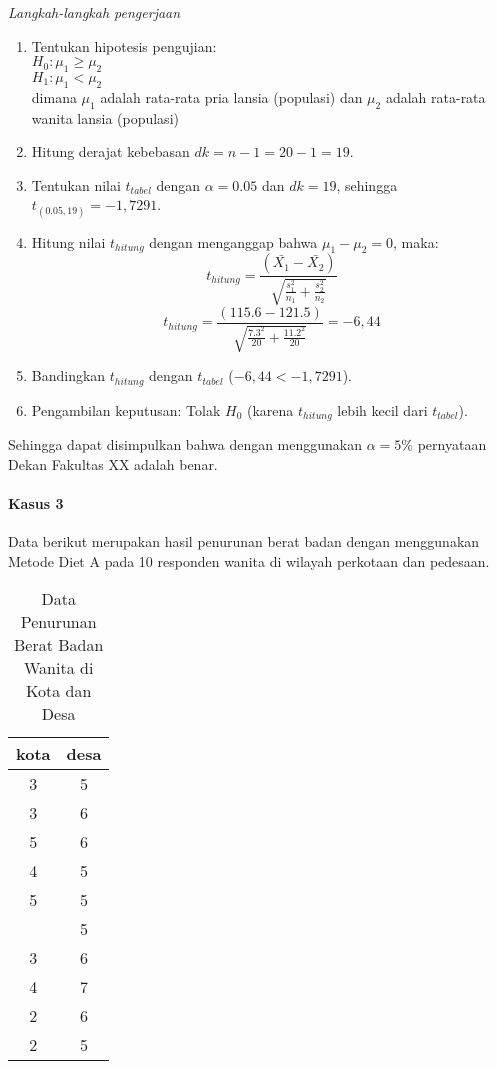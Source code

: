 \documentclass[
]{book}
\providecommand{\tightlist}{%
  \setlength{\itemsep}{0pt}\setlength{\parskip}{0pt}}
\begin{document}
\emph{Langkah-langkah pengerjaan}

\begin{enumerate}
\def\labelenumi{\arabic{enumi}.}
\tightlist
\item
  Tentukan hipotesis pengujian:\\
  \(H_0 : \mu_1 \geq \mu_2\)\\
  \(H_1 : \mu_1 < \mu_2\)\\
  dimana \(\mu_1\) adalah rata-rata pria lansia (populasi) dan \(\mu_2\) adalah rata-rata wanita lansia (populasi)
\item
  Hitung derajat kebebasan \(dk = n - 1 = 20 - 1 = 19\).
\item
  Tentukan nilai \(t_{tabel}\) dengan \(\alpha=0.05\) dan \(dk = 19\), sehingga \(t_{(0.05,19)} = -1,7291\).
\item
  Hitung nilai \(t_{hitung}\) dengan menganggap bahwa \(\mu_1-\mu_2 = 0\), maka:\\
  \[
  t_{hitung} = \frac{(\bar{X_1}-\bar{X_2})}{\sqrt{\frac{s_1^2}{n_1}+\frac{s_2^2}{n_2}}}
  \]
  \[
  t_{hitung} = \frac{(115.6-121.5)}{\sqrt{\frac{7.3^2}{20}+\frac{11.2^2}{20}}} = -6,44
  \]
\item
  Bandingkan \(t_{hitung}\) dengan \(t_{tabel}\) (\(-6,44<-1,7291\)).
\item
  Pengambilan keputusan: Tolak \(H_0\) (karena \(t_{hitung}\) lebih kecil dari \(t_{tabel}\)).
\end{enumerate}

Sehingga dapat disimpulkan bahwa dengan menggunakan \(\alpha = 5\%\) pernyataan Dekan Fakultas XX adalah benar.

\hypertarget{kasus-3}{%
\paragraph{Kasus 3}\label{kasus-3}}

Data berikut merupakan hasil penurunan berat badan dengan menggunakan Metode Diet A pada 10 responden wanita di wilayah perkotaan dan pedesaan.

\begin{table}

\caption{\label{tab:unnamed-chunk-9}Data Penurunan Berat Badan Wanita di Kota dan Desa}
\centering
\begin{tabular}[t]{cc}
\toprule
kota & desa\\
\midrule
3 & 5\\
3 & 6\\
5 & 6\\
4 & 5\\
5 & 5\\
\addlinespace
3 & 5\\
3 & 6\\
4 & 7\\
2 & 6\\
2 & 5\\
\bottomrule
\end{tabular}
\end{table}
\end{document}
